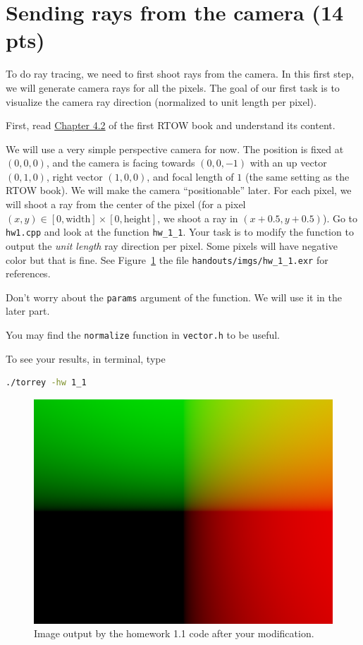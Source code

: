 \section{Sending rays from the camera (14 pts)}
To do ray tracing, we need to first shoot rays from the camera. In this first step, we will generate camera rays for all the pixels. The goal of our first task is to visualize the camera ray direction (normalized to unit length per pixel).

First, read \href{https://raytracing.github.io/books/RayTracingInOneWeekend.html\#rays,asimplecamera,andbackground}{Chapter 4.2} of the first RTOW book and understand its content.

We will use a very simple perspective camera for now. The position is fixed at $(0, 0, 0)$, and the camera is facing towards $(0, 0, -1)$ with an up vector $(0, 1, 0)$, right vector $(1, 0, 0)$, and focal length of $1$ (the same setting as the RTOW book). We will make the camera ``positionable'' later. For each pixel, we will shoot a ray from the center of the pixel (for a pixel $(x, y) \in [0, \text{width}] \times [0, \text{height}]$, we shoot a ray in $(x + 0.5, y + 0.5)$). Go to \lstinline{hw1.cpp} and look at the function \lstinline{hw_1_1}. Your task is to modify the function to output the \emph{unit length} ray direction per pixel. Some pixels will have negative color but that is fine. See Figure~\ref{fig:hw_1_1_after} the file \lstinline{handouts/imgs/hw_1_1.exr} for references.

Don't worry about the \lstinline{params} argument of the function. We will use it in the later part.

You may find the \lstinline{normalize} function in \lstinline{vector.h} to be useful.

To see your results, in terminal, type
\begin{lstlisting}[language=bash]
  ./torrey -hw 1_1
\end{lstlisting}

\begin{figure}[ht]
    \centering
    \includegraphics[width=0.5\linewidth]{imgs/hw_1_1_after.png}
    \caption{Image output by the homework 1.1 code after your modification.}
    \label{fig:hw_1_1_after}
\end{figure}

